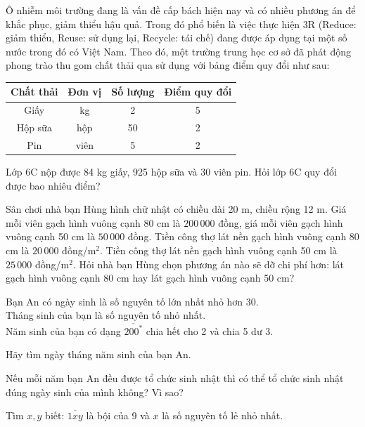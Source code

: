 \begin{bt}
Ô nhiễm môi trường đang là vấn đề cấp bách hiện nay và có nhiều phương án để khắc phục, giảm thiểu hậu quả. Trong đó phổ biến là việc thực hiện 3R (Reduce: giảm thiểu, Reuse: sử dụng lại, Recycle: tái chế) đang được áp dụng tại một số nước trong đó có Việt Nam. Theo đó, một trường trung học cơ sở đã phát động phong trào thu gom chất thải qua sử dụng với bảng điểm quy đổi như sau:
\begin{center}
\begin{tabular}{|c|c|c|c|}
	\hline \bf Chất thải & \bf Đơn vị & \bf Số lượng & \bf Điểm quy đổi \\
	\hline Giấy & kg & 2 & 5 \\
	\hline Hộp sữa & hộp & 50 & 2 \\
	\hline Pin & viên & 5 & 2 \\
	\hline
\end{tabular}
\end{center}
Lớp 6C nộp được 84 kg giấy, 925 hộp sữa và 30 viên pin. Hỏi lớp 6C quy đổi được bao nhiêu điểm?
\end{bt}


\begin{bt}
Sân chơi nhà bạn Hùng hình chữ nhật có chiều dài 20 m, chiều rộng 12 m. Giá mỗi viên gạch hình vuông cạnh 80 cm là $200\,000$ đồng, giá mỗi viên gạch hình vuông cạnh 50 cm là $50\,000$ đồng. Tiền công thợ lát nền gạch hình vuông cạnh 80 cm là $20\,000$ đồng/m$^2$. Tiền công thợ lát nền gạch hình vuông cạnh 50 cm là $25\,000$ đồng/m$^2$. Hỏi nhà bạn Hùng chọn phương án nào sẽ đỡ chi phí hơn: lát gạch hình vuông cạnh 80 cm hay lát gạch hình vuông cạnh 50 cm?
	
\end{bt}


\begin{bt}
	Bạn An có ngày sinh là số nguyên tố lớn nhất nhỏ hơn 30.\\
	Tháng sinh của bạn là số nguyên tố nhỏ nhất.\\
	Năm sinh của bạn có dạng $\overline{200^*}$ chia hết cho 2 và chia 5 dư 3.
	\begin{listEX}
		\item Hãy tìm ngày tháng năm sinh của bạn An.
		\item 	Nếu mỗi năm bạn An đều được tổ chức sinh nhật thì có thể tổ chức sinh nhật đúng ngày sinh của mình không? Vì sao?
	\end{listEX}
	
\end{bt}


\begin{bt}
	
	Tìm $x, y$ biết: $\overline{1 x y}$ là bội của 9 và $x$ là số nguyên tố lẻ nhỏ nhất.
	

\end{bt}
